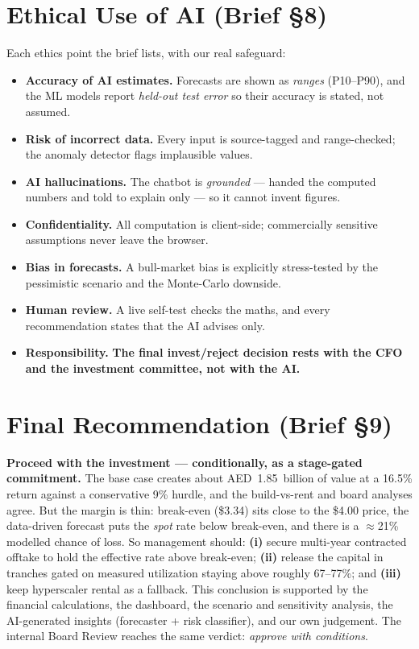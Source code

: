 \documentclass[11pt,a4paper]{article}
\begin{document}
\section{Ethical Use of AI (Brief \S8)}
Each ethics point the brief lists, with our real safeguard:
\begin{itemize}
  \item \textbf{Accuracy of AI estimates.} Forecasts are shown as \emph{ranges} (P10--P90), and the ML
  models report \emph{held-out test error} so their accuracy is stated, not assumed.
  \item \textbf{Risk of incorrect data.} Every input is source-tagged and range-checked; the anomaly
  detector flags implausible values.
  \item \textbf{AI hallucinations.} The chatbot is \emph{grounded} --- handed the computed numbers and
  told to explain only --- so it cannot invent figures.
  \item \textbf{Confidentiality.} All computation is client-side; commercially sensitive assumptions
  never leave the browser.
  \item \textbf{Bias in forecasts.} A bull-market bias is explicitly stress-tested by the pessimistic
  scenario and the Monte-Carlo downside.
  \item \textbf{Human review.} A live self-test checks the maths, and every recommendation states that
  the AI advises only.
  \item \textbf{Responsibility.} \textbf{The final invest/reject decision rests with the CFO and the
  investment committee, not with the AI.}
\end{itemize}

\section{Final Recommendation (Brief \S9)}
\textbf{Proceed with the investment --- conditionally, as a stage-gated commitment.} The base case
creates about AED~1.85~billion of value at a 16.5\% return against a conservative 9\% hurdle, and the
build-vs-rent and board analyses agree. But the margin is thin: break-even (\$3.34) sits close to the
\$4.00 price, the data-driven forecast puts the \emph{spot} rate below break-even, and there is a
$\approx$21\% modelled chance of loss. So management should: \textbf{(i)} secure multi-year contracted
offtake to hold the effective rate above break-even; \textbf{(ii)} release the capital in tranches
gated on measured utilization staying above roughly 67--77\%; and \textbf{(iii)} keep hyperscaler
rental as a fallback. This conclusion is supported by the financial calculations, the dashboard, the
scenario and sensitivity analysis, the AI-generated insights (forecaster + risk classifier), and our
own judgement. The internal Board Review reaches the same verdict: \emph{approve with conditions}.
\end{document}
